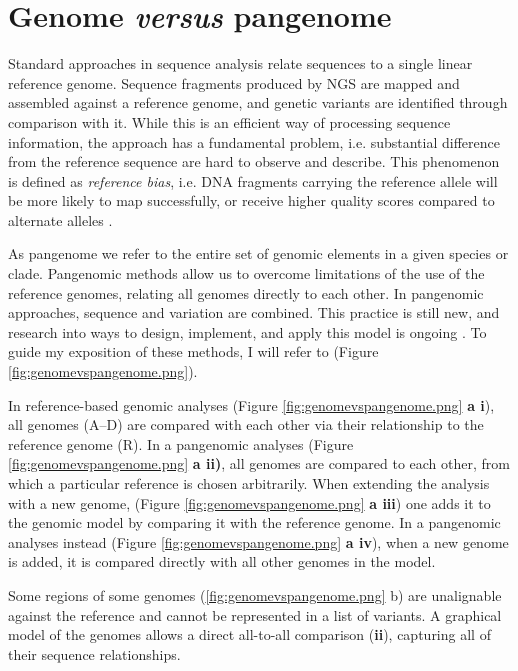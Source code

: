 \section{Genome \textit{versus} pangenome}

Standard approaches in sequence analysis relate sequences to a single linear reference genome. Sequence fragments produced by NGS are mapped and assembled against a reference genome, and genetic variants are identified through comparison with it. While this is an efficient way of processing sequence information, the approach has a fundamental problem, i.e. substantial difference from the reference sequence are hard to observe and describe. This phenomenon is defined as \textit{reference bias}, i.e.  DNA fragments carrying the reference allele will be more likely to map successfully, or receive higher quality scores compared to alternate alleles \cite{eizenga2020pangenome}.

As pangenome we refer to the entire set of genomic elements in a given species or clade.
Pangenomic methods allow us to overcome limitations of the use of the reference genomes, relating all genomes directly to each other. In pangenomic approaches, sequence and variation are combined. This practice is still new, and research into ways to design, implement, and apply this model is ongoing \cite{eizenga2020pangenome}.
To guide my exposition of these methods, I will refer to (Figure \ref{fig:genomevspangenome.png}).


In reference-based genomic analyses (Figure \ref{fig:genomevspangenome.png} \textbf{a i}), all genomes (A–D) are compared with each other via their relationship to the reference genome (R).
In a pangenomic analyses (Figure \ref{fig:genomevspangenome.png} \textbf{a ii)},  all genomes are compared to each other, from which a particular reference is chosen arbitrarily. 
When extending the analysis with a new genome, (Figure \ref{fig:genomevspangenome.png} \textbf{a iii}) one adds it to the genomic model by comparing it with the reference genome.
In a pangenomic analyses instead (Figure \ref{fig:genomevspangenome.png} \textbf{a iv}), when a new genome is added, it is compared directly with all other genomes in the model.
 
Some regions of some genomes (\ref{fig:genomevspangenome.png} b) are unalignable against the reference and cannot be represented in a list of variants. A graphical model of the genomes allows a direct all-to-all comparison (\textbf{ii}), capturing all of their sequence relationships.

